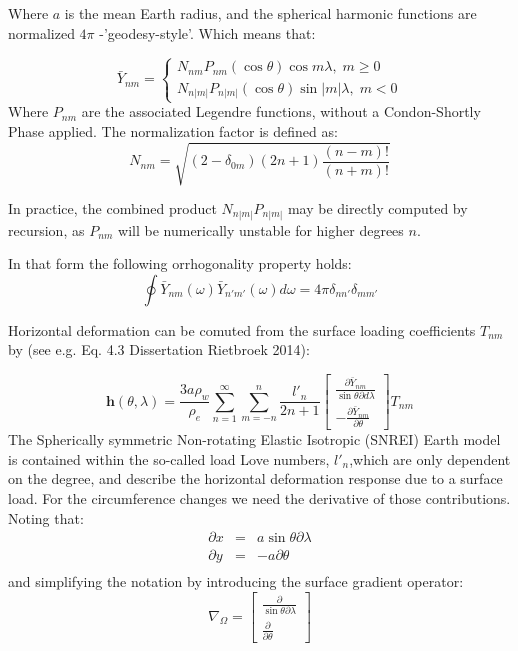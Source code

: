 \documentclass[a4paper,10pt,twoside,openany]{article}
\begin{document}
Where $a$ is the mean Earth radius, and the spherical harmonic functions are normalized
$4\pi$ -'geodesy-style'. Which means that:

\begin{equation}
\bar{Y}_{nm}=\left\{\begin{array}{c} N_{nm}P_{nm}(\cos \theta)\cos m\lambda,\; m\ge0\\N_{n|m|}P_{n|m|}(\cos \theta)\sin |m|\lambda,\; m<0\end{array}\right.
\end{equation}
Where $P_{nm}$ are the associated Legendre functions, without a
Condon-Shortly Phase applied. The normalization factor is defined as:
\begin{equation}
N_{nm}=\sqrt{(2-\delta_{0m})(2n+1)\frac{(n-m)!}{(n+m)!}}
\end{equation}

In practice, the combined product $N_{n|m|}P_{n|m|}$ may be  directly computed by
recursion, as $P_{nm}$ will be numerically unstable for higher degrees
$n$.

In that form the following orrhogonality property holds:
\begin{equation}
\oint \bar{Y}_{nm}(\omega)\bar{Y}_{n'm'}(\omega)d\omega=4\pi \delta_{nn'}\delta_{mm'}
  \end{equation}


Horizontal deformation can be comuted from the surface loading
coefficients $T_{nm}$ by (see e.g. Eq. 4.3 Dissertation Rietbroek 2014):

\begin{equation}
\textbf{h}(\theta,\lambda)=\frac{3a\rho_{w}}{\rho_{e}}\sum_{n=1}^{\infty}\sum_{m=-n}^{n}\frac{l'_{n}}{2n+1}\left[\begin{array}{c}
    \frac{\partial \bar{Y}_{nm}}{\sin \theta \partial
      d\lambda}\\-\frac{\partial \bar{Y}_{nm}}{\partial \theta}\end{array}\right]T_{nm}
\end{equation}
The Spherically symmetric Non-rotating Elastic Isotropic (SNREI) Earth model is contained within the so-called load Love
numbers, $l'_{n}$,which are only dependent on the degree, and describe
the horizontal deformation response due to a surface load.
For the circumference changes we need the derivative of those
contributions. Noting that:
\begin{eqnarray}
\partial x &=& a\sin\theta \partial \lambda\\
\partial y &=& -a\partial \theta\\
\end{eqnarray}
and simplifying the notation by introducing the surface gradient
operator:
\begin{equation}
  \nabla_{\Omega}=\left[\begin{array}{c}\frac{\partial}{\sin\theta
        \partial \lambda}\\\frac{\partial}{\partial \theta} \end{array}\right]
  \end{equation}
\end{document}
